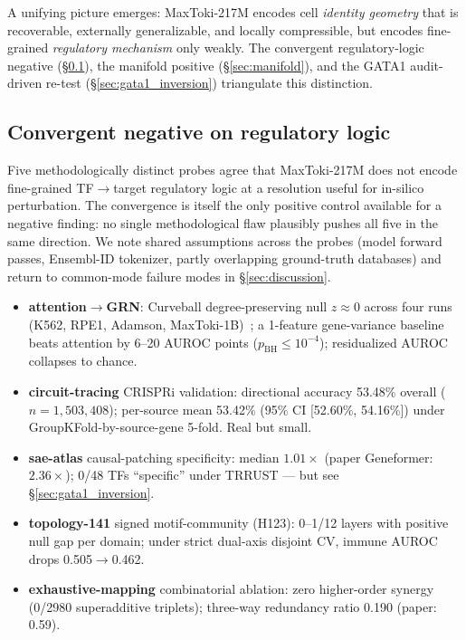 \documentclass{article}
\newcommand{\maxtoki}{MaxToki-217M\xspace}
\newcommand{\maxtokibig}{MaxToki-1B\xspace}
\begin{document}
A unifying picture emerges: \maxtoki{} encodes cell \emph{identity
geometry} that is recoverable, externally generalizable, and
locally compressible, but encodes fine-grained \emph{regulatory
mechanism} only weakly. The convergent regulatory-logic negative
(\S\ref{sec:convergent_negative}), the manifold positive
(\S\ref{sec:manifold}), and the GATA1 audit-driven re-test
(\S\ref{sec:gata1_inversion}) triangulate this distinction.

\subsection{Convergent negative on regulatory logic}
\label{sec:convergent_negative}

Five methodologically distinct probes agree that \maxtoki{} does
not encode fine-grained TF$\to$target regulatory logic at a
resolution useful for in-silico perturbation. The convergence is
itself the only positive control available for a negative finding:
no single methodological flaw plausibly pushes all five in the same
direction. We note shared assumptions across the probes (model
forward passes, Ensembl-ID tokenizer, partly overlapping
ground-truth databases) and return to common-mode failure modes in
\S\ref{sec:discussion}.

\begin{itemize}[leftmargin=*,itemsep=0pt]
\item \textbf{attention$\to$GRN}: Curveball degree-preserving null
$z\approx 0$ across four runs (K562, RPE1, Adamson,
\maxtokibig{})~\citep{replogle2022perturbseq}; a 1-feature
gene-variance baseline beats attention by 6--20 AUROC points
($p_{\text{BH}}\le 10^{-4}$); residualized AUROC collapses to
chance.
\item \textbf{circuit-tracing} CRISPRi validation: directional
accuracy 53.48\% overall ($n{=}1{,}503{,}408$); per-source mean
53.42\% (95\% CI [52.60\%, 54.16\%]) under
GroupKFold-by-source-gene 5-fold. Real but small.
\item \textbf{sae-atlas} causal-patching specificity: median
$1.01\times$ (paper Geneformer: $2.36\times$); 0/48 TFs
``specific'' under TRRUST --- but see
\S\ref{sec:gata1_inversion}.
\item \textbf{topology-141} signed motif-community (H123):
0--1/12 layers with positive null gap per domain; under strict
dual-axis disjoint CV, immune AUROC drops 0.505$\to$0.462.
\item \textbf{exhaustive-mapping} combinatorial ablation: zero
higher-order synergy (0/2980 superadditive triplets); three-way
redundancy ratio 0.190 (paper: 0.59).
\end{itemize}
\end{document}
